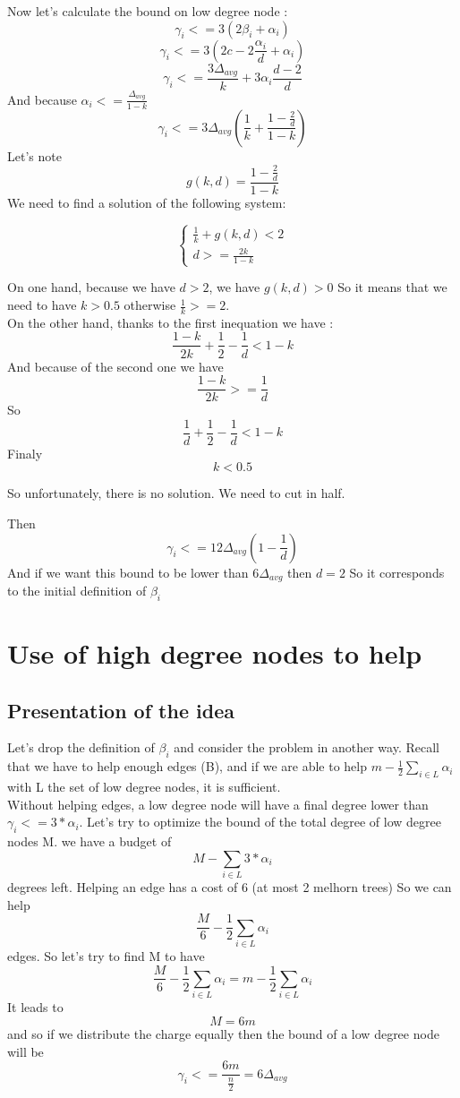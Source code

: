 \documentclass{article}
\begin{document}
Now let's calculate the bound on low degree node :
$$\gamma_i <= 3(2\beta_i+\alpha_i)$$
$$\gamma_i <= 3(2c - 2\frac{\alpha_i}{d} + \alpha_i)$$
$$\gamma_i <= \frac{3\Delta_{avg}}{k} + 3\alpha_i\frac{d-2}{d}$$
And because $\alpha_i <= \frac{\Delta_{avg}}{1-k}$
$$\gamma_i <= 3\Delta_{avg}\left(\frac{1}{k}+\frac{1-\frac{2}{d}}{1-k}\right)$$
Let's note $$g(k,d) = \frac{1-\frac{2}{d}}{1-k}$$
We need to find a solution of the following system:

\begin{equation*}
\begin{cases}
  \frac{1}{k} + g(k,d) < 2\\
  d >= \frac{2k}{1-k}
\end{cases}
\end{equation*}

On one hand, because we have $d > 2$, we have $g(k, d) > 0$ So it means that we need
to have $k > 0.5$ otherwise $\frac{1}{k} >= 2$.\\

On the other hand, thanks to the first inequation we have :
$$\frac{1-k}{2k} + \frac{1}{2} - \frac{1}{d} < 1-k$$
And because of the second one we have 
$$\frac{1-k}{2k} >= \frac{1}{d}$$
So $$\frac{1}{d} + \frac{1}{2} - \frac{1}{d} < 1 - k$$
Finaly $$k < 0.5$$

So unfortunately, there is no solution. We need to cut in half.

Then $$\gamma_i <= 12\Delta_{avg}\left(1-\frac{1}{d}\right)$$
And if we want this bound to be lower than $6\Delta_{avg}$ then $d = 2$
So it corresponds to the initial definition of $\beta_i$ 

\newpage

\section{Use of high degree nodes to help}

\subsection{Presentation of the idea}

Let's drop the definition of $\beta_i$ and consider the problem in another
way. Recall that we have to help enough edges (B), and if we are able to help
$m - \frac{1}{2}\sum_{i \in L}\alpha_i$ with L the set of low degree nodes,
it is sufficient.\\

Without helping edges, a low degree node will have a final degree lower
than $\gamma_i <= 3*\alpha_i$. Let's try to optimize the bound of the
total degree of low degree nodes M. we have a budget of
$$M - \sum_{i \in L}3*\alpha_i$$
degrees left.
Helping an edge has a cost of 6 (at most 2 melhorn trees)
So we can help $$\frac{M}{6} - \frac{1}{2}\sum_{i \in L}\alpha_i$$
edges.
So let's try to find M to have
$$\frac{M}{6} - \frac{1}{2}\sum_{i \in L}\alpha_i = m - \frac{1}{2}\sum_{i \in L}\alpha_i$$
It leads to
$$M = 6m$$
and so if we distribute the charge equally then the bound of a low degree node
will be $$\gamma_i <= \frac{6m}{\frac{n}{2}} = 6\Delta_{avg}$$
\end{document}
